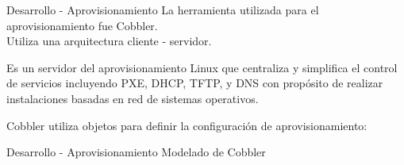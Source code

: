 
\begin{frame}{Desarrollo - Aprovisionamiento}
    \vspace{-1.5cm}
    La herramienta utilizada para el aprovisionamiento fue Cobbler.
    \\
    Utiliza una arquitectura cliente - servidor.
    \begin{block}{}
        Es un servidor del aprovisionamiento Linux que centraliza y simplifica el control de servicios incluyendo PXE, DHCP, TFTP, y DNS con propósito de realizar instalaciones basadas en red de sistemas operativos.
    \end{block}

    \begin{block}{}
        Cobbler utiliza objetos para definir la configuración de aprovisionamiento:
    \end{block}

\end{frame}

\begin{frame}{Desarrollo - Aprovisionamiento}
    \vspace{0cm} {Modelado de Cobbler}
    \vspace{0.5cm}
    \begin{figure}[ht]
       \centering
       \vspace{-0.50cm}
    \end{figure}
\end{frame}

